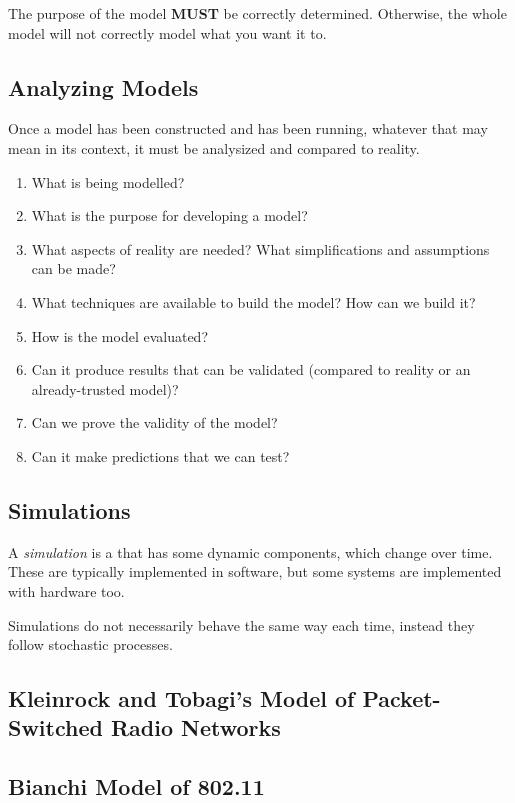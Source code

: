 The purpose of the model \textbf{MUST} be correctly determined.
Otherwise, the whole model will not correctly model what you want it to.

\subsection{Analyzing Models}\label{subsec:Model_Analysis}
Once a model has been constructed and has been running, whatever that may mean in its context, it must be analysized and compared to reality.
\begin{enumerate}[noitemsep]
\item What is being modelled?
\item What is the purpose for developing a model?
\item What aspects of reality are needed? What simplifications and assumptions can be made?
\item What techniques are available to build the model? How can we build it?
\item How is the model evaluated?
\item Can it produce results that can be validated (compared to reality or an already-trusted model)?
\item Can we prove the validity of the model?
\item Can it make predictions that we can test?
\end{enumerate}

\subsection{Simulations}\label{subsec:Simulations}
\begin{definition}[Simulation]\label{def:Simulation}
  A \emph{simulation} is a  that has some dynamic components, which change over time.
  These are typically implemented in software, but some systems are implemented with hardware too.

  \begin{remark}\label{rmk:Stochastic_Simulations}
    Simulations do not necessarily behave the same way each time, instead they follow stochastic processes.
  \end{remark}
\end{definition}

\subsection{Kleinrock and Tobagi's Model of Packet-Switched Radio Networks}\label{subsec:Kleinrock_Tobagi_Model}
\subsection{Bianchi Model of 802.11}\label{subsec:Bianchi_Model}

